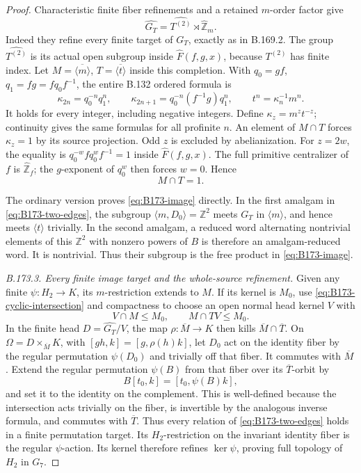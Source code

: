 \begin{proof}
Characteristic finite fiber refinements and a retained \(m\)-order
factor give
\[
 \widehat{G_T}=\widehat{T^{(2)}}\rtimes\widehat{\mathbb Z}_m.
 \tag{B.173.2}
\]
Indeed they refine every finite target of \(G_T\), exactly as in
B.169.2. The group \(\widehat{T^{(2)}}\) is its actual open subgroup
inside \(\widehat F(f,g,x)\), because \(T^{(2)}\) has finite index.
Let \(M=\overline{\langle m\rangle}\), \(T=\overline{\langle t\rangle}\)
inside this completion. With \(q_0=gf\), \(q_1=fg=fq_0f^{-1}\),
the entire B.132 ordered formula is
\[
 \kappa_{2n}=q_0^{-n}q_1^n,\qquad
 \kappa_{2n+1}=q_0^{-n}(f^{-1}g)q_1^n,\qquad
 t^n=\kappa_n^{-1}m^n.
 \tag{B.173.3}
\]
It holds for every integer, including negative integers.
Define \(\kappa_z=m^zt^{-z}\); continuity gives the same formulas
for all profinite \(n\). An element of \(M\cap T\) forces
\(\kappa_z=1\) by its source projection. Odd \(z\) is excluded by
abelianization. For \(z=2w\), the equality is
\(q_0^{-w}fq_0^wf^{-1}=1\) inside \(\widehat F(f,g,x)\).
The full primitive centralizer of \(f\) is
\(\widehat{\mathbb Z}_f\); the \(g\)-exponent of \(q_0^w\) then forces
\(w=0\). Hence
\begin{equation}\label{eq:B173-cyclic-intersection}
                            M\cap T=1.
\end{equation}

The ordinary version proves \eqref{eq:B173-image} directly.
In the first amalgam in \eqref{eq:B173-two-edges}, the subgroup
\(\langle m,D_0\rangle=\mathbb Z^2\) meets \(G_T\) in
\(\langle m\rangle\), and hence meets \(\langle t\rangle\) trivially.
In the second amalgam, a reduced word alternating nontrivial elements
of this \(\mathbb Z^2\) with nonzero powers of \(B\) is therefore an
amalgam-reduced word. It is nontrivial. Thus their subgroup is the
free product in \eqref{eq:B173-image}.

\emph{B.173.3. Every finite image target and the whole-source refinement.}
Given any finite \(\psi:H_2\to K\), its \(m\)-restriction extends to
\(M\). If its kernel is \(M_0\), use
\eqref{eq:B173-cyclic-intersection} and compactness to choose an open
normal head kernel \(V\) with
\[
 V\cap M\le M_0,\qquad M\cap TV\le M_0.
\]
In the finite head \(D=\widehat{G_T}/V\), the map
\(\rho:\overline M\to K\) then kills
\(\overline M\cap\overline T\).
On \(\Omega=D\times_{\overline M}K\), with
\([gh,k]=[g,\rho(h)k]\), let \(D_0\) act on the identity fiber by
the regular permutation \(\psi(D_0)\) and trivially off that fiber.
It commutes with \(\overline M\). Extend the regular permutation
\(\psi(B)\) from that fiber over its \(\overline T\)-orbit by
\[
 B[t_0,k]=[t_0,\psi(B)k],
\]
and set it to the identity on the complement.
This is well-defined because the intersection acts trivially on the
fiber, is invertible by the analogous inverse formula, and commutes
with \(\overline T\). Thus every relation of
\eqref{eq:B173-two-edges} holds in a finite permutation target.
Its \(H_2\)-restriction on the invariant identity fiber is the regular
\(\psi\)-action. Its kernel therefore refines \(\ker\psi\), proving
full topology of \(H_2\) in \(G_7\).


\end{proof}

